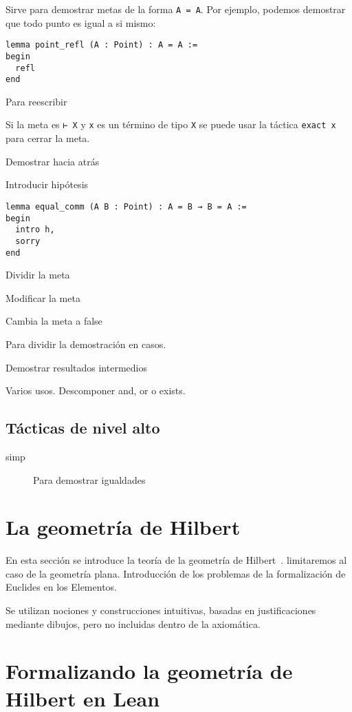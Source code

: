 \begin{description}[font=\sffamily\bfseries, leftmargin=1.5cm, style=nextline]
    \item[refl] Sirve para demostrar metas de la forma \lstinline{A = A}. Por
        ejemplo, podemos demostrar que todo punto es igual a si mismo:

         \begin{lstlisting}
lemma point_refl (A : Point) : A = A :=
begin
  refl
end
        \end{lstlisting}
    \item[rw] Para reescribir
    \item[exact] Si la meta es  \lstinline{⊢ X} y \lstinline{x} es un término de
        tipo \lstinline{X} se puede usar la táctica \lstinline{exact x} para
        cerrar la meta.
    \item[apply] Demostrar hacia atrás
    \item[intro] Introducir hipótesis
        \begin{lstlisting}
lemma equal_comm (A B : Point) : A = B → B = A :=
begin
  intro h,
  sorry
end
        \end{lstlisting}
        

    \item[split] Dividir la meta
    \item[left, right] Modificar la meta
    \item[exfalso] Cambia la meta a false
    \item[by_cases] Para dividir la demostración en casos.
    \item[have] Demostrar resultados intermedios
    \item[cases] Varios usos. Descomponer and, or o exists.
        
\end{description}

\subsection{Tácticas de nivel alto}

\begin{description}
    \item[simp] Para demostrar igualdades
\end{description}

\newpage
\section{La geometría de Hilbert}

En esta sección se introduce la teoría de la geometría de
Hilbert~\cite{hilbert1902grundlagenfoundations}.
limitaremos al caso de la geometría plana. Introducción de los problemas de la
formalización de Euclides en los Elementos.

Se utilizan nociones y construcciones intuitivas, basadas en justificaciones
mediante dibujos, pero no incluidas dentro de la axiomática.


\newpage
\section{Formalizando la geometría de Hilbert en Lean}
